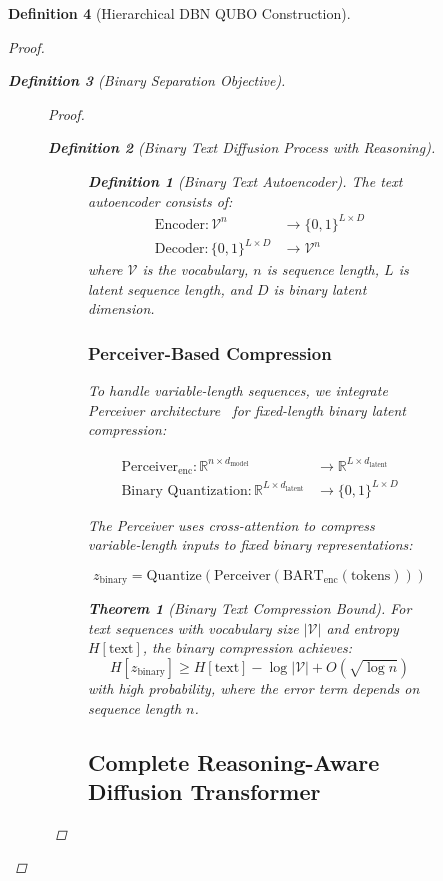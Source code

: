 \documentclass{article}
\newtheorem{theorem}{Theorem}
\newtheorem{definition}{Definition}
\begin{document}
\begin{definition}[Hierarchical DBN QUBO Construction]
\begin{proof}
\begin{definition}[Binary Separation Objective]
\begin{figure}[H]
\begin{proof}
\begin{definition}[Binary Text Diffusion Process with Reasoning]
\begin{figure}[H]
\begin{definition}[Binary Text Autoencoder]
The text autoencoder consists of:
\begin{align}
\text{Encoder}: \mathcal{V}^n &\rightarrow \{0,1\}^{L \times D}\\
\text{Decoder}: \{0,1\}^{L \times D} &\rightarrow \mathcal{V}^n
\end{align}
where $\mathcal{V}$ is the vocabulary, $n$ is sequence length, $L$ is latent sequence length, and $D$ is binary latent dimension.
\end{definition}

\subsubsection{Perceiver-Based Compression}

To handle variable-length sequences, we integrate Perceiver architecture~\cite{jaegle2021perceiver} for fixed-length binary latent compression:

\begin{align}
\text{Perceiver}_{\text{enc}}: \mathbb{R}^{n \times d_{\text{model}}} &\rightarrow \mathbb{R}^{L \times d_{\text{latent}}}\\
\text{Binary Quantization}: \mathbb{R}^{L \times d_{\text{latent}}} &\rightarrow \{0,1\}^{L \times D}
\end{align}

The Perceiver uses cross-attention to compress variable-length inputs to fixed binary representations:

\begin{equation}
z_{\text{binary}} = \text{Quantize}(\text{Perceiver}(\text{BART}_{\text{enc}}(\text{tokens})))
\end{equation}

\begin{theorem}[Binary Text Compression Bound]
For text sequences with vocabulary size $|\mathcal{V}|$ and entropy $H[\text{text}]$, the binary compression achieves:
\begin{equation}
H[z_{\text{binary}}] \geq H[\text{text}] - \log|\mathcal{V}| + O(\sqrt{\log n})
\end{equation}
with high probability, where the error term depends on sequence length $n$.
\end{theorem}

\subsection{Complete Reasoning-Aware Diffusion Transformer}


\end{figure}
\end{definition}
\end{proof}
\end{figure}
\end{definition}
\end{proof}
\end{definition}
\end{document}
